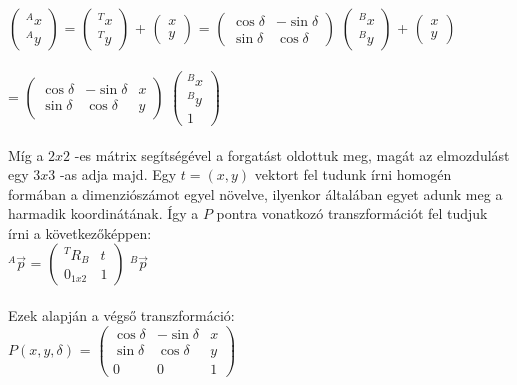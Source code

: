 \(
\begin{pmatrix}
	{}^{A}x\\
	{}^{A}y
\end{pmatrix}	 
\) = 
\(
\begin{pmatrix}
	{}^{T}x\\
	{}^{T}y
\end{pmatrix}	 
\) + 
\(
\begin{pmatrix}
	x\\
	y
\end{pmatrix}
\) =
\(
\begin{pmatrix}
	\cos\delta & -\sin\delta\\
	\sin\delta & \cos\delta
\end{pmatrix}
\)
\(
\begin{pmatrix}
	{}^{B}x\\
	{}^{B}y
\end{pmatrix}	 
\) + 
\(
\begin{pmatrix}
	x\\
	y
\end{pmatrix}	 
\)\\\\ = 
\(
	\begin{pmatrix}
		\cos\delta & -\sin\delta & x\\
		\sin\delta & \cos\delta & y
	\end{pmatrix}
\)
\(
\begin{pmatrix}
	{}^{B}x\\
	{}^{B}y\\
	1
\end{pmatrix}	 
\)\\\\
Míg a $2 x 2$ -es mátrix segítségével a forgatást oldottuk meg, magát az elmozdulást egy $ 3 x 3 $ -as adja majd. Egy $t = (x, y) $ vektort fel tudunk írni homogén formában a dimenziószámot egyel növelve, ilyenkor általában egyet adunk meg a harmadik koordinátának. Így a $ P $ pontra vonatkozó transzformációt fel tudjuk írni a következőképpen:\\

$ {}^{A}\vec{p} $ = 
\(
\begin{pmatrix}
	{}^{T}R{}_{B} & t\\
	0_{1x2} & 1
\end{pmatrix}	 
\)
$ {}^{B}\vec{p} $\\\\
Ezek alapján a végső transzformáció:\\

$P(x, y, \delta)$ = 
\(
	\begin{pmatrix}
		\cos\delta & -\sin\delta & x\\
		\sin\delta & \cos\delta & y\\
		0 & 0 & 1
	\end{pmatrix}
\)



